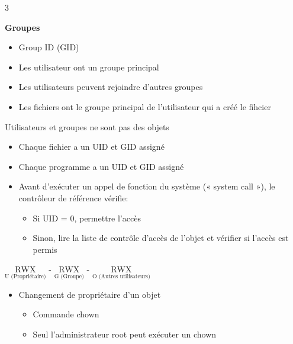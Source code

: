 \documentclass[9pt, a4paper, twoside]{article}
\begin{document}
\begin{multicols}{3}
\begin{flushleft}
    \scriptsize \textbf{Groupes}
\end{flushleft}

\begin{itemize}[label=$\bullet$]
    \item \scriptsize Group ID (GID)
    \item \scriptsize Les utilisateur ont un groupe principal
    \item \scriptsize Les utilisateurs peuvent rejoindre d'autres groupes
    \item \scriptsize Les fichiers ont le groupe principal de l'utilisateur qui a créé le fihcier
\end{itemize}

\begin{flushleft}
    \scriptsize Utilisateurs et groupes ne sont pas des objets
\end{flushleft}

\begin{itemize}[label=$\bullet$]
    \item \scriptsize Chaque fichier a un UID et GID assigné
    \item \scriptsize Chaque programme a un UID et GID assigné
    \item \scriptsize Avant d'exécuter un appel de fonction du système (« system call »), le contrôleur de référence vérifie:
    \begin{itemize}[label=$\circ$]
        \item \scriptsize Si UID = 0, permettre l'accès
        \item \scriptsize Sinon, lire la liste de contrôle d'accès de l'objet et vérifier si l'accès est permis
    \end{itemize}
\end{itemize}

\begin{flushleft}
    \scriptsize $\underset{\text{U (Propriétaire)}}{\text{RWX}}$ - $\underset{\text{G (Groupe)}}{\text{RWX}}$ - $\underset{\text{O (Autres utilisateurs)}}{\text{RWX}}$
\end{flushleft}

\begin{itemize}[label=$\bullet$]
    \item \scriptsize  Changement de propriétaire d'un objet
    \begin{itemize}[label=$\circ$]
        \item \scriptsize Commande chown
        \item \scriptsize Seul l'administrateur root peut exécuter un chown
    \end{itemize}
\end{itemize}


\end{multicols}
\end{document}
